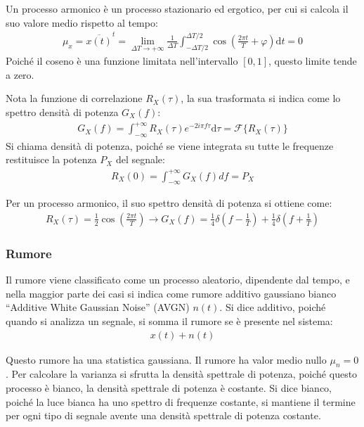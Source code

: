 \documentclass{article}
\newcommand{\df}{\mathrm{d}}
\numberwithin{equation}{subsection}
\begin{document}
Un processo armonico è un processo stazionario ed ergotico, per cui si calcola il suo valore medio rispetto al tempo:
\begin{gather*}
    \mu_x=\overline{x(t)}^t=\lim_{\Delta T\to+\infty}\displaystyle\frac{1}{\Delta T}\int_{-\Delta T/2}^{\Delta T/2}\cos\left(\frac{2\pi t}{T}+\varphi\right)\df t=0
\end{gather*}
Poiché il coseno è una funzione limitata nell'intervallo $[0,1]$, questo limite tende a zero. 


Nota la funzione di correlazione $R_X(\tau)$, la sua trasformata si indica come lo spettro densità di potenza $G_X(f)$:
\begin{gather*}
    G_X(f)=\displaystyle\int_{-\infty}^{+\infty}R_X(\tau)e^{-2i\pi f\tau}\df\tau=\mathscr{F}\{R_X(\tau)\}
\end{gather*}
Si chiama densità di potenza, poiché se viene integrata su tutte le frequenze restituisce la potenza $P_X$ del segnale:
\begin{gather*}
    R_X(0)=\displaystyle\int_{-\infty}^{+\infty}G_X(f)df=P_X
\end{gather*}

Per un processo armonico, il suo spettro densità di potenza si ottiene come:
\begin{gather*}
    R_X(\tau)=\displaystyle\frac{1}{2}\cos\left(\frac{2\pi t}{T}\right)\to G_X(f)=\displaystyle\frac{1}{4}\delta\left(f-\frac{1}{T}\right)+\frac{1}{4}\delta\left(f+\frac{1}{T}\right)
\end{gather*}

\subsubsection{Rumore}
Il rumore viene classificato come un processo aleatorio, dipendente dal tempo, e nella maggior parte dei casi si indica come rumore additivo gaussiano bianco 
``Additive White Gaussian Noise'' (AVGN) $n(t)$. 
Si dice additivo, poiché quando si analizza un segnale, si somma il rumore se è presente nel sistema:
\begin{gather*}
    x(t)+n(t)
\end{gather*} 

Questo rumore ha una statistica gaussiana. Il rumore ha valor medio nullo $\mu_n=0$. 
Per calcolare la varianza si sfrutta la densità spettrale di potenza, poiché questo processo è bianco, la densità spettrale di potenza è costante. 
Si dice bianco, poiché la luce bianca ha uno spettro di frequenze costante, si mantiene il termine per ogni tipo di segnale avente una densità spettrale di potenza 
costante. 
\end{document}
